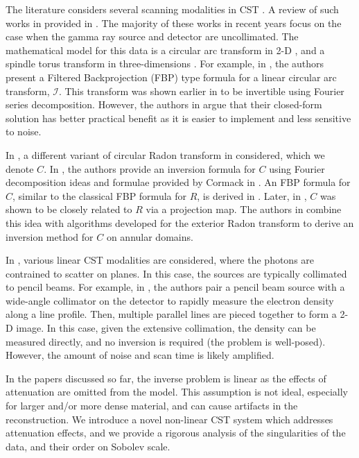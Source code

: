 \documentclass[a4paper,12pt]{amsart}
\numberwithin{equation}{section}
\theoremstyle{plain}
\numberwithin{theorem}{section}
\theoremstyle{definition}
\theoremstyle{remark}
\theoremstyle{remark}
\theoremstyle{remark}
\begin{document}
The literature considers several scanning modalities in CST \cite{norton,NT,pal,me2,rigaud20183d,rigaud20213d,rigaud2021reconstruction,farmer1971new,farmer1974further,holt1985compton,strecker1982scatter}.  A review of such works in provided in \cite{truong2012recent}. The majority of these works in recent years focus on the case when the gamma ray source and detector are uncollimated. The mathematical model for this data is a circular arc transform in 2-D \cite{norton,pal}, and a spindle torus transform in three-dimensions \cite{me2,rigaud20183d}. For example, in \cite{norton}, the authors present a Filtered Backprojection (FBP) type formula for a linear circular arc transform, $\mathcal{I}$. This transform was shown earlier in \cite{Co1963} to be invertible using Fourier series decomposition. However, the authors in \cite{norton} argue that their closed-form solution has better practical benefit as it is easier to implement and less sensitive to noise.

In \cite{NT,pal}, a different variant of circular Radon transform in considered, which we denote $C$. In \cite{NT}, the authors provide an inversion formula for $C$ using Fourier decomposition ideas and formulae provided by Cormack in \cite{Co1963}. An FBP formula for $C$, similar to the classical FBP formula for $R$, is derived in \cite{pal}. Later, in \cite{webberholman,truong2019compton}, $C$ was shown to be closely related to $R$ via a projection map. The authors in \cite{truong2019compton} combine this idea with algorithms developed for the exterior Radon transform \cite{quinto1988tomographic} to derive an inversion method for $C$ on annular domains.

In \cite{farmer1971new,farmer1974further,holt1985compton,strecker1982scatter}, various linear CST modalities are considered, where the photons are contrained to scatter on planes. In this case, the sources are typically collimated to pencil beams. For example, in \cite{farmer1971new}, the authors pair a pencil beam source with a wide-angle collimator on the detector to rapidly measure the electron density along a line profile. Then, multiple parallel lines are pieced together to form a 2-D image. In this case, given the extensive collimation, the density can be measured directly, and no inversion is required (the problem is well-posed). However, the amount of noise and scan time is likely amplified.

In the papers discussed so far, the inverse problem is linear as the effects of attenuation are omitted from the model. This assumption is not ideal, especially for larger and/or more dense material, and can cause artifacts in the reconstruction. We introduce a novel non-linear CST system which addresses attenuation effects, and we provide a rigorous analysis of the singularities of the data, and their order on Sobolev scale.
\end{document}
